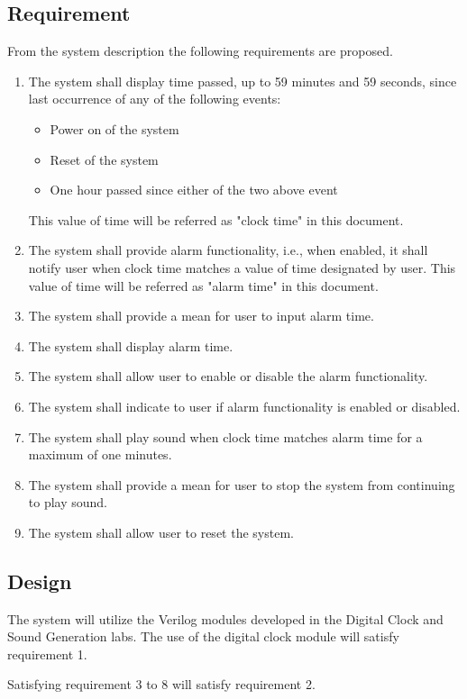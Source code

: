 \documentclass[conference]{IEEEtran}
\begin{document}
\subsection{Requirement}
From the system description the following requirements are proposed.
\begin{enumerate}
    \item The system shall display time passed, up to 59 minutes and 59 seconds, since last occurrence of
    any of the following events:
    \begin{itemize}
        \item Power on of the system
        \item Reset of the system
        \item One hour passed since either of the two above event
    \end{itemize}
    This value of time will be referred as "clock time" in this document.
    \item The system shall provide alarm functionality, i.e., when enabled, it shall notify user  
    when clock time matches a value of time designated by user. This value of time will be referred as 
    "alarm time" in this document.
    \item The system shall provide a mean for user to input alarm time.
    \item The system shall display alarm time.
    \item The system shall allow user to enable or disable the alarm functionality.
    \item The system shall indicate to user if alarm functionality is enabled or disabled.
    \item The system shall play sound when clock time matches alarm time for a maximum of one minutes.
    \item The system shall provide a mean for user to stop the system from continuing to play sound.
    \item The system shall allow user to reset the system.
\end{enumerate}

\subsection{Design}
The system will utilize the Verilog modules developed in the Digital Clock and Sound Generation labs. 
The use of the digital clock module will satisfy requirement 1.

Satisfying requirement 3 to 8 will satisfy requirement 2.
\end{document}
